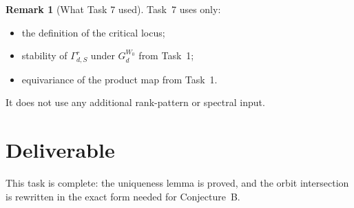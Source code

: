 \documentclass{article}
\theoremstyle{definition}
\newtheorem{remark}[theorem]{Remark}
\begin{document}
\begin{remark}[What Task 7 used]
Task~7 uses only:
\begin{itemize}
\item the definition of the critical locus;
\item stability of $\Gamma_{d,S}^r$ under $G_d^{W_0}$ from Task~1;
\item equivariance of the product map from Task~1.
\end{itemize}
It does not use any additional rank-pattern or spectral input.
\end{remark}

\section{Deliverable}

This task is complete: the uniqueness lemma is proved, and the orbit
intersection is rewritten in the exact form needed for Conjecture~B.
\end{document}
